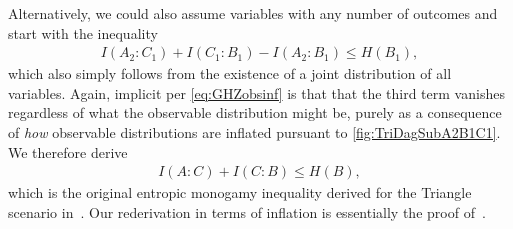 Alternatively, we could also assume variables with any number of outcomes and start with the inequality~\cite{fritz2013marginal}
\begin{align}
	I(A_2 : C_1) + I(C_1 : B_1) - I(A_2 : B_1) \leq H(B_1),	
\end{align}
which also simply follows from the existence of a joint distribution of all variables. Again, implicit per \cref{eq:GHZobsinf} is that that the third term vanishes regardless of what the observable distribution might be, purely as a consequence of \emph{how} observable distributions are inflated pursuant to \cref{fig:TriDagSubA2B1C1}. We therefore derive
\begin{align}\label{eq:monogomyofcorrelations}
	I(A : C) + I(C : B) \leq H(B) ,
\end{align}
which is the original entropic monogamy inequality derived for the Triangle scenario in~\cite{fritz2012bell}. Our rederivation in terms of inflation is essentially the proof of~\citet{pusey2014gdag}.



\bigskip

